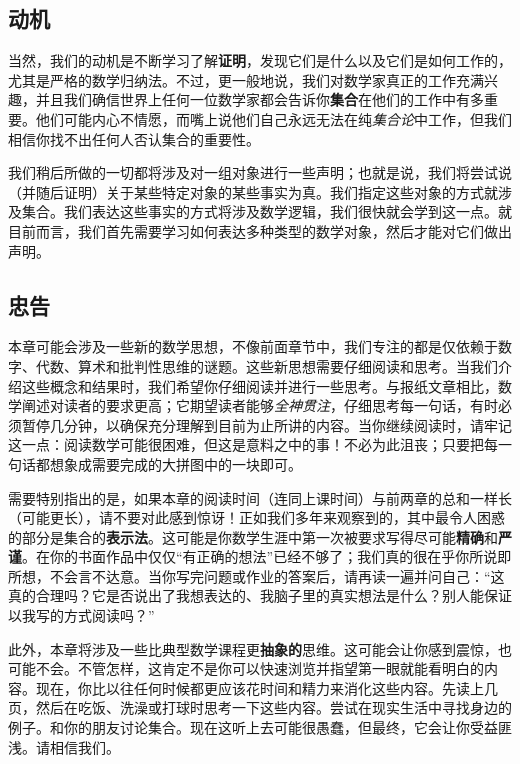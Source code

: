 \subsection{动机}

当然，我们的动机是不断学习了解\textbf{证明}，发现它们是什么以及它们是如何工作的，尤其是严格的数学归纳法。不过，更一般地说，我们对数学家真正的工作充满兴趣，并且我们确信世界上任何一位数学家都会告诉你\textbf{集合}在他们的工作中有多重要。他们可能内心不情愿，而嘴上说他们自己永远无法在纯\emph{集合论}中工作，但我们相信你找不出任何人否认集合的重要性。

我们稍后所做的一切都将涉及对一组对象进行一些声明；也就是说，我们将尝试说（并随后证明）关于某些特定对象的某些事实为真。我们指定这些对象的方式就涉及集合。我们表达这些事实的方式将涉及数学逻辑，我们很快就会学到这一点。就目前而言，我们首先需要学习如何表达多种类型的数学对象，然后才能对它们做出声明。

\subsection{忠告}

本章可能会涉及一些新的数学思想，不像前面章节中，我们专注的都是仅依赖于数字、代数、算术和批判性思维的谜题。这些新思想需要仔细阅读和思考。当我们介绍这些概念和结果时，我们希望你仔细阅读并进行一些思考。与报纸文章相比，数学阐述对读者的要求更高；它期望读者能够\emph{全神贯注}，仔细思考每一句话，有时必须暂停几分钟，以确保充分理解到目前为止所讲的内容。当你继续阅读时，请牢记这一点：阅读数学可能很困难，但这是意料之中的事！不必为此沮丧；只要把每一句话都想象成需要完成的大拼图中的一块即可。

需要特别指出的是，如果本章的阅读时间（连同上课时间）与前两章的总和一样长（可能更长），请不要对此感到惊讶！正如我们多年来观察到的，其中最令人困惑的部分是集合的\textbf{表示法}。这可能是你数学生涯中第一次被要求写得尽可能\textbf{精确}和\textbf{严谨}。在你的书面作品中仅仅``有正确的想法''已经不够了；我们真的很在乎你所说即所想，不会言不达意。当你写完问题或作业的答案后，请再读一遍并问自己：``这真的合理吗？它是否说出了我想表达的、我脑子里的真实想法是什么？别人能保证以我写的方式阅读吗？''

此外，本章将涉及一些比典型数学课程更\textbf{抽象的}思维。这可能会让你感到震惊，也可能不会。不管怎样，这肯定不是你可以快速浏览并指望第一眼就能看明白的内容。现在，你比以往任何时候都更应该花时间和精力来消化这些内容。先读上几页，然后在吃饭、洗澡或打球时思考一下这些内容。尝试在现实生活中寻找身边的例子。和你的朋友讨论集合。现在这听上去可能很愚蠢，但最终，它会让你受益匪浅。请相信我们。